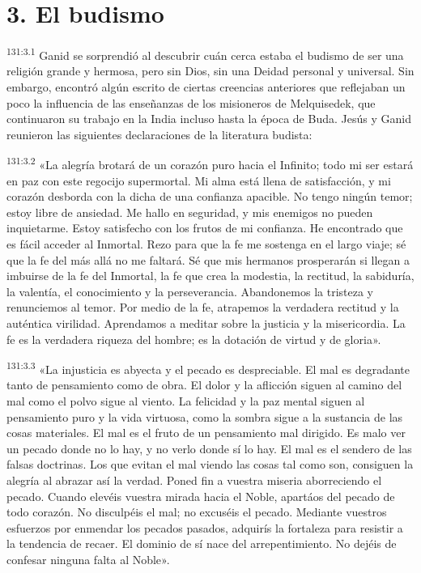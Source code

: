 \section*{3. El budismo}
\par
\textsuperscript{131:3.1} Ganid se sorprendió al descubrir cuán cerca estaba el budismo de ser una religión grande y hermosa, pero sin Dios, sin una Deidad personal y universal. Sin embargo, encontró algún escrito de ciertas creencias anteriores que reflejaban un poco la influencia de las enseñanzas de los misioneros de Melquisedek, que continuaron su trabajo en la India incluso hasta la época de Buda. Jesús y Ganid reunieron las siguientes declaraciones de la literatura budista:

\par
\textsuperscript{131:3.2} «La alegría brotará de un corazón puro hacia el Infinito; todo mi ser estará en paz con este regocijo supermortal. Mi alma está llena de satisfacción, y mi corazón desborda con la dicha de una confianza apacible. No tengo ningún temor; estoy libre de ansiedad. Me hallo en seguridad, y mis enemigos no pueden inquietarme. Estoy satisfecho con los frutos de mi confianza. He encontrado que es fácil acceder al Inmortal. Rezo para que la fe me sostenga en el largo viaje; sé que la fe del más allá no me faltará. Sé que mis hermanos prosperarán si llegan a imbuirse de la fe del Inmortal, la fe que crea la modestia, la rectitud, la sabiduría, la valentía, el conocimiento y la perseverancia. Abandonemos la tristeza y renunciemos al temor. Por medio de la fe, atrapemos la verdadera rectitud y la auténtica virilidad. Aprendamos a meditar sobre la justicia y la misericordia. La fe es la verdadera riqueza del hombre; es la dotación de virtud y de gloria».

\par
\textsuperscript{131:3.3} «La injusticia es abyecta y el pecado es despreciable. El mal es degradante tanto de pensamiento como de obra. El dolor y la aflicción siguen al camino del mal como el polvo sigue al viento. La felicidad y la paz mental siguen al pensamiento puro y la vida virtuosa, como la sombra sigue a la sustancia de las cosas materiales. El mal es el fruto de un pensamiento mal dirigido. Es malo ver un pecado donde no lo hay, y no verlo donde sí lo hay. El mal es el sendero de las falsas doctrinas. Los que evitan el mal viendo las cosas tal como son, consiguen la alegría al abrazar así la verdad. Poned fin a vuestra miseria aborreciendo el pecado. Cuando elevéis vuestra mirada hacia el Noble, apartáos del pecado de todo corazón. No disculpéis el mal; no excuséis el pecado. Mediante vuestros esfuerzos por enmendar los pecados pasados, adquirís la fortaleza para resistir a la tendencia de recaer. El dominio de sí nace del arrepentimiento. No dejéis de confesar ninguna falta al Noble».


